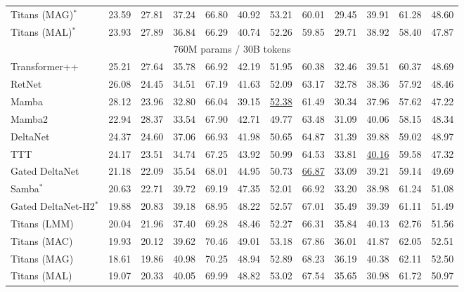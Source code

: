 \begin{table*}[t!]
{\begin{tabular}{l|c c|c c c c c c c c c}
Titans (MAG)$^*$         & \cellcolor{mygreen}23.59 & 27.81  & \cellcolor{mygreen}37.24 & \cellcolor{mygreen}66.80 & 40.92 &  \cellcolor{mygreen}53.21 & 60.01 & 29.45 & 39.91 & 61.28 & 48.60 \\
Titans (MAL)$^*$         & 23.93 & 27.89  & 36.84 & 66.29 & 40.74 & 52.26 &  59.85 & \cellcolor{mygreen}29.71 & 38.92 & 58.40 & 47.87 \\
\midrule
\multicolumn{12}{c}{760M params / 30B tokens} \\
\midrule
 Transformer++ & 25.21 & 27.64 & 35.78 & 66.92 & 42.19 &	51.95 & 60.38	& 32.46 &  39.51  & 60.37  & 48.69 \\
 RetNet & 26.08 & 24.45 & 34.51 & 67.19 & 41.63 &	52.09 & 63.17	& 32.78 &  38.36  & 57.92  &  48.46\\
 Mamba & 28.12 & 23.96 & 32.80 & 66.04 & 39.15 &	\cellcolor{myblue}\underline{52.38} & 61.49	& 30.34 &  37.96  & 57.62  & 47.22 \\
 Mamba2 & 22.94 & 28.37 & 33.54 & 67.90 & 42.71 &	49.77 & {63.48}	& 31.09 &  40.06  & 58.15  & 48.34 \\
 DeltaNet & 24.37 & 24.60 & 37.06 & 66.93 & 41.98 &	50.65 & 64.87	& 31.39 &  39.88  & 59.02  & 48.97 \\
 TTT & 24.17 & 23.51 & 34.74 & 67.25 & 43.92 & 50.99 & 64.53 & 33.81 & \cellcolor{myblue}\underline{40.16} & 59.58 & 47.32 \\
 Gated DeltaNet & {21.18} & {22.09} & {35.54} & {68.01} & {44.95} & {50.73} & \cellcolor{myblue}\underline{66.87}	& {33.09} &  {39.21}  & 59.14  & 49.69 \\
 Samba$^{*}$ & 20.63 & 22.71 & 39.72 & 69.19 & 47.35 &	52.01 & 66.92	& 33.20 &  38.98  & 61.24  & 51.08 \\
  Gated DeltaNet-H2$^*$ & {19.88} & 20.83 & {39.18} & 68.95 & {48.22} &	{52.57} & 67.01	& {35.49} &  {39.39}  & 61.11  & 51.49 \\
  \midrule
Titans (LMM) & \cellcolor{myblue}20.04 & \cellcolor{myblue}21.96 &  \cellcolor{myblue}37.40 & \cellcolor{myblue}69.28  & \cellcolor{myblue}48.46 & 52.27 & 66.31 & \cellcolor{myblue}35.84 & 40.13 & \cellcolor{myblue}62.76 & \cellcolor{myblue}51.56\\
Titans (MAC) & 19.93 & 20.12 &  39.62 & \cellcolor{mygreen}70.46  & \cellcolor{mygreen}49.01 & \cellcolor{mygreen}53.18 & 67.86 & 36.01 & \cellcolor{mygreen}41.87 & \cellcolor{mygreen}62.05 & \cellcolor{mygreen}52.51\\
Titans (MAG) & \cellcolor{mygreen}18.61 & \cellcolor{mygreen}19.86 &  \cellcolor{mygreen}40.98 & 70.25  & 48.94 & 52.89 & \cellcolor{mygreen}68.23 & \cellcolor{mygreen}36.19 & 40.38 & 62.11 & 52.50\\
Titans (MAL) & 19.07 & 20.33 &  40.05 & 69.99  & 48.82 & 53.02& 67.54 & 35.65 & 30.98 & 61.72 & 50.97\\
\bottomrule
\end{tabular}
}
\end{table*}